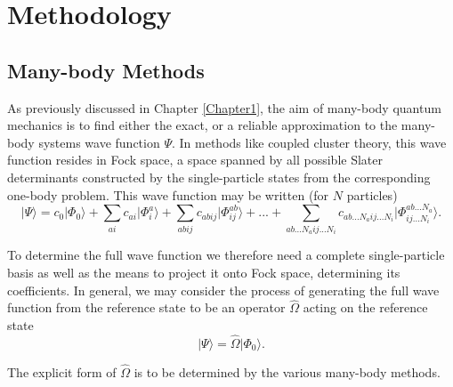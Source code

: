 
\chapter{Methodology} %

\label{Chapter4} %



\section{Many-body Methods}

As previously discussed in Chapter \ref{Chapter1}, the aim of many-body quantum mechanics 
is to find either the exact, or a reliable
approximation to the many-body systems wave function $\Psi$. In methods like coupled cluster theory, this wave
function resides in Fock space, a space spanned by all possible Slater
determinants constructed by the single-particle states from the
corresponding one-body problem. This wave function may be written (for
$N$ particles)
\begin{equation}
\vert \Psi \rangle = c_0 \vert \Phi_0 \rangle + \sum_{ai} c_{ai }\vert \Phi_i^a \rangle +  \sum_{abij} c_{abij} \vert \Phi_{ij}^{ab} \rangle + ... + \sum_{ab...N_a ij...N_i} c_{ab...N_a ij...N_i} \vert \Phi_{ij...N_i}^{ab...N_a} \rangle.
\label{eqn:fullCI}
\end{equation}

To determine the full wave function we therefore need a complete
single-particle basis as well as the means to project it onto Fock
space, determining its coefficients. In general, we may consider the
process of generating the full wave function from the reference state
to be an operator $\hat{\Omega}$ acting on the reference state
\begin{equation}
\vert \Psi \rangle = \hat{\Omega} \vert \Phi_0 \rangle .
\label{eqn:reference_operator}
\end{equation}

The explicit form of $\hat{\Omega}$ is to be determined by the various many-body methods. 

